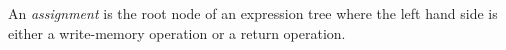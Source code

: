 \begin{defn}An \textit{assignment} is the root node of an expression tree where the left hand side is either a write-memory operation or a return operation.\end{defn}


